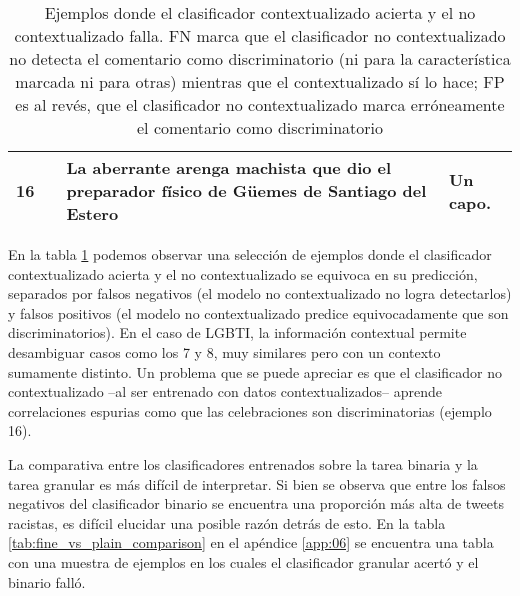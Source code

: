 \begin{table}[ht!]
\begin{tabular}{p{} p{} p{} p{}}
        16 &            & La aberrante arenga machista que dio el preparador físico de Güemes de Santiago del Estero & Un capo. \\
        \hline
    \end{tabular}
    \caption{Ejemplos donde el clasificador contextualizado acierta y el no contextualizado falla. FN marca que el clasificador no contextualizado no detecta el comentario como discriminatorio (ni para la característica marcada ni para otras) mientras que el contextualizado sí lo hace; FP es al revés, que el clasificador no contextualizado marca erróneamente el comentario como discriminatorio  }
    \label{tab:context_vs_no_context_error}
\end{table}


En la tabla \ref{tab:context_vs_no_context_error} podemos observar una selección de ejemplos donde el clasificador contextualizado acierta y el no contextualizado se equivoca en su predicción, separados por falsos negativos (el modelo no contextualizado no logra detectarlos) y falsos positivos (el modelo no contextualizado predice equivocadamente que son discriminatorios). En el caso de LGBTI, la información contextual permite desambiguar casos como los 7 y 8, muy similares pero con un contexto sumamente distinto. Un problema que se puede apreciar es que el clasificador no contextualizado --al ser entrenado con datos contextualizados-- aprende correlaciones espurias como que las celebraciones son discriminatorias (ejemplo 16).



La comparativa entre los clasificadores entrenados sobre la tarea binaria y la tarea granular es más difícil de interpretar. Si bien se observa que entre los falsos negativos del clasificador binario se encuentra una proporción más alta de tweets racistas, es difícil elucidar una posible razón detrás de esto. En la tabla \ref{tab:fine_vs_plain_comparison} en el apéndice \ref{app:06} se encuentra una tabla con una muestra de ejemplos en los cuales el clasificador granular acertó y el binario falló.